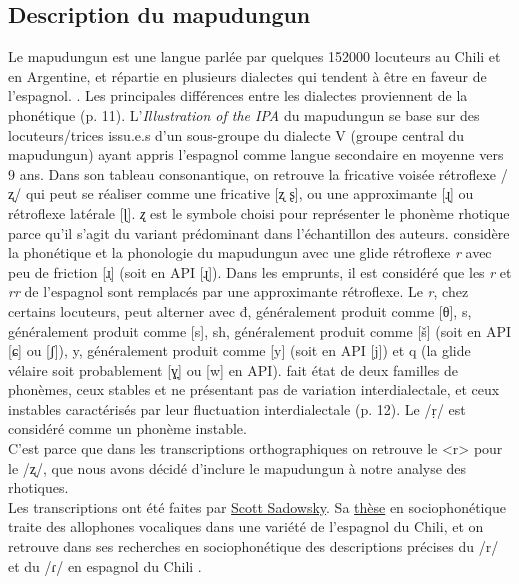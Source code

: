 \subsection{Description du mapudungun} \label{subsec:mapuche}

Le mapudungun est une langue parlée par quelques 152000 locuteurs au Chili et en Argentine, et répartie en plusieurs dialectes qui tendent à être  en faveur de l'espagnol. \parencite{sadowskyMapudungun2013}. Les principales différences entre les dialectes proviennent de la phonétique \parencite{smeetsGrammarMapuche2008} (p. 11). L'\textit{Illustration of the IPA} du mapudungun se base sur des locuteurs/trices issu.e.s d'un sous-groupe du dialecte V (groupe central du mapudungun) ayant appris l'espagnol comme langue secondaire en moyenne vers 9 ans.
Dans son tableau consonantique, on retrouve la fricative voisée rétroflexe /ʐ/ qui peut se réaliser comme une fricative [ʐ ʂ], ou une approximante [ɻ] ou rétroflexe latérale [ɭ]. \textit{ʐ} est le symbole choisi pour représenter le phonème rhotique parce qu'il s'agit du variant prédominant dans l'échantillon des auteurs.
\textcite{smeetsGrammarMapuche2008} considère la phonétique et la phonologie du mapudungun  avec une glide rétroflexe \textit{r} avec peu de friction [ɹ̣] (soit en API [ɻ]). Dans les emprunts, il est considéré que les \textit{r} et \textit{rr} de l'espagnol sont remplacés par une approximante rétroflexe. Le \textit{r}, chez certains locuteurs, peut alterner avec đ, généralement produit comme [θ], s, généralement produit comme [s], sh, généralement produit comme [š] (soit en API [ɕ] ou [ʃ]), y, généralement produit comme [y] (soit en API [j]) et q (la glide vélaire soit probablement [ɣ̞] ou [w] en API).
\textcite{croeseEstudioDialectologicoMapuche1980} fait état de deux familles de phonèmes, ceux stables et ne présentant pas de variation interdialectale, et ceux instables caractérisés par leur fluctuation interdialectale (p. 12). Le /ṛ/ est considéré comme un phonème instable.\\


C'est parce que dans les transcriptions orthographiques on retrouve le <r> pour le /ʐ/, que nous avons décidé d'inclure le mapudungun à notre analyse des rhotiques.\\
Les transcriptions ont été faites par \href{https://sadowsky.cl/}{Scott Sadowsky}. Sa \href{http://repositorio.udec.cl/xmlui/handle/11594/4338}{thèse} \parencite{sadowskyNaturalezaFoneticaEstratificacion2012} en sociophonétique traite des allophones vocaliques dans une variété de l'espagnol du Chili, et on retrouve dans ses recherches en sociophonétique des descriptions précises du /r/ et du /ɾ/ en espagnol du Chili \parencite{sadowskyVariacionSociofoneticaConsonantes2015}.

